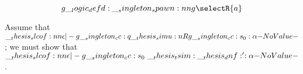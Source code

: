 \begin{equation*}
  g \defd \spawn{g}{\selectR{a}}
\end{equation*}

\begin{description}
\item{}
\item[Immediate input bisimulation]
  Assume that $\slcof{\epsilon |- g \cc q \simu{R} g \cc s_0 : \alpha}$;
  we must show that $\slcof{\epsilon |- g \cc s_0 \ \tsim \dnf' : \alpha}$.
\end{description}

